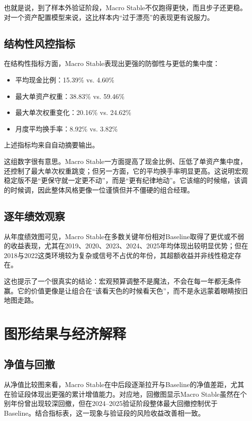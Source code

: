 \documentclass[12pt,a4paper]{ctexart}
\begin{document}
也就是说，到了样本外验证阶段，Macro Stable不仅跑得更快，而且步子还更稳。对一个资产配置模型来说，这比样本内“过于漂亮”的表现更有说服力。

\subsection{结构性风控指标}

在结构性指标方面，Macro Stable表现出更强的防御性与更低的集中度：

\begin{itemize}
    \item 平均现金比例：15.39\% vs. 4.60\%
    \item 最大单资产权重：38.83\% vs. 59.46\%
    \item 最大单次权重变化：20.16\% vs. 24.62\%
    \item 月度平均换手率：8.92\% vs. 3.82\%
\end{itemize}

上述指标均来自自动摘要输出。

这组数字很有意思。Macro Stable一方面提高了现金比例、压低了单资产集中度，还控制了最大单次权重跳变；但另一方面，它的平均换手率明显更高。这说明宏观稳定版不是“更保守就一定更不动”，而是“更有纪律地动”。它该缩的时候缩，该调的时候调，因此整体风格更像一位谨慎但并不僵硬的组合经理。

\subsection{逐年绩效观察}

从年度绩效图可见，Macro Stable在多数关键年份相对Baseline取得了更优或不弱的收益表现，尤其在2019、2020、2023、2024、2025年均体现出较明显优势；但在2018与2022这类环境较为复杂或信号不占优的年份，其超额收益并非线性稳定存在。

这也提示了一个很真实的结论：宏观预算调整不是魔法，不会在每一年都无条件赢。它的价值更像是让组合在“该看天色的时候看天色”，而不是永远蒙着眼睛按旧地图走路。

\section{图形结果与经济解释}

\subsection{净值与回撤}

从净值比较图来看，Macro Stable在中后段逐渐拉开与Baseline的净值差距，尤其在验证段体现出更强的累计增值能力。对应地，回撤图显示Macro Stable虽然在个别年份曾出现较深回撤，但在2024--2025验证阶段整体最大回撤控制优于Baseline。结合指标表，这一现象与验证段的风险收益改善相一致。
\end{document}
